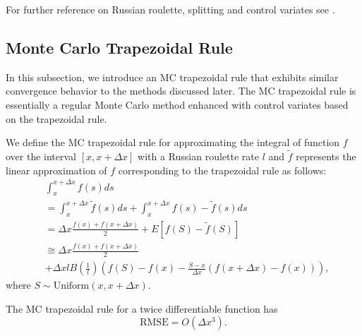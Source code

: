 \documentclass[a4paper,12pt]{article}
\begin{document}
\begin{related}[MC modification]
  For further reference on Russian roulette, splitting and control variates
  see \cite{veach_robust_1997}.
\end{related}

\subsection{Monte Carlo Trapezoidal Rule}

In this subsection, we introduce an MC trapezoidal rule that
exhibits similar convergence behavior to the methods discussed later.
The MC trapezoidal rule is essentially a regular Monte Carlo method
enhanced with control variates based on the trapezoidal rule.

\begin{definition}
  We define the MC trapezoidal rule for approximating the integral
  of function $f$ over the interval $[x, x+\Delta x]$ with a Russian roulette rate
  $l$ and $\tilde{f}$ represents the linear approximation of $f$ corresponding
  to the trapezoidal rule as follows:
  \begin{align}
     & \int_{x}^{x+\Delta x} f(s) ds                           \\
     & = \int_{x}^{x+\Delta x}  \tilde{f}(s) ds +
    \int_{x}^{x+\Delta x}  f(s) - \tilde{f}(s) ds              \\
     & = \Delta x \frac{f(x) + f(x+\Delta x)}{2}
    + E \left[f(S) - \tilde{f}(S)\right]                       \\
     & \cong \Delta x \frac{f(x) + f(x+\Delta x)}{2} \nonumber \\
     & + \Delta x l B\left( \frac{1}{l}\right)
    \left(f(S) - f(x) - \frac{S - x}{\Delta x}
    \left(f(x+\Delta x) - f(x)\right) \right), \label{eq:MCtrap}
  \end{align}
  where $S \sim \text{Uniform}(x,x+\Delta x)$.
\end{definition}

\begin{lemma} \label{lem:rmse mctrap}
  The MC trapezoidal rule
  for a twice differentiable function has
  \begin{equation}
    \text{RMSE} =O\left( \Delta x^{3} \right) .
  \end{equation}
\end{lemma}
\end{document}
